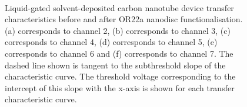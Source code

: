 \documentclass[
  a4paper,
]{scrbook}
\begin{document}
\begin{figure}
\begin{minipage}[t]{0.45\linewidth}
{{}

}

\end{minipage}%
%
\begin{minipage}[t]{0.01\linewidth}

{\centering 

~

}

\end{minipage}%

\caption{\label{fig-solvent-deposited-sensing-TX}Liquid-gated
solvent-deposited carbon nanotube device transfer characteristics before
and after OR22a nanodisc functionalisation. (a) corresponds to channel
2, (b) corresponds to channel 3, (c) corresponds to channel 4, (d)
corresponds to channel 5, (e) corresponds to channel 6 and (f)
corresponds to channel 7. The dashed line shown is tangent to the
subthreshold slope of the characteristic curve. The threshold voltage
corresponding to the intercept of this slope with the x-axis is shown
for each transfer characteristic curve.}

\end{figure}
\end{document}
